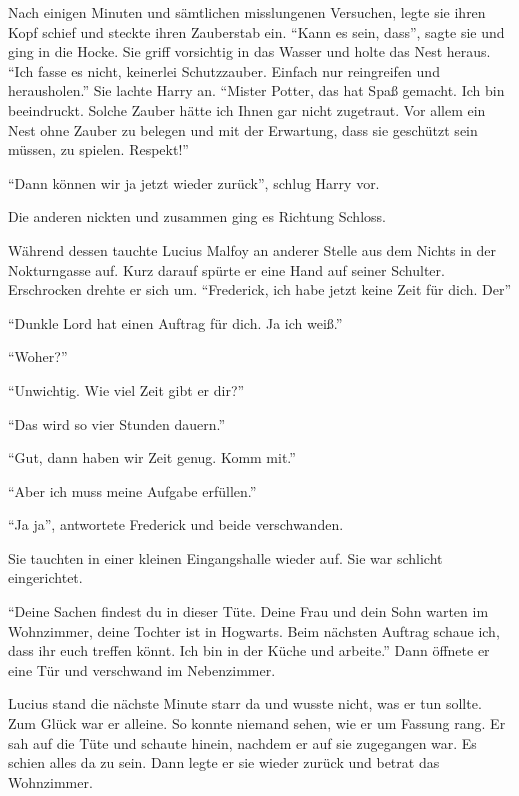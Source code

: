 Nach einigen Minuten und sämtlichen misslungenen Versuchen, legte sie ihren Kopf schief und steckte ihren Zauberstab ein. \enquote{Kann es sein, dass\abs}, sagte sie und ging in die Hocke. Sie griff vorsichtig in das Wasser und holte das Nest heraus. \enquote{Ich fasse es nicht, keinerlei Schutzzauber. Einfach nur reingreifen und herausholen.} Sie lachte Harry an. \enquote{Mister Potter, das hat Spaß gemacht. Ich bin beeindruckt. Solche Zauber hätte ich Ihnen gar nicht zugetraut. Vor allem ein Nest ohne Zauber zu belegen und mit der Erwartung, dass sie geschützt sein müssen, zu spielen. Respekt!}

\enquote{Dann können wir ja jetzt wieder zurück}, schlug Harry vor.

Die anderen nickten und zusammen ging es Richtung Schloss.

\trenn

Während dessen tauchte Lucius Malfoy an anderer Stelle aus dem Nichts in der Nokturngasse auf. Kurz darauf spürte er eine Hand auf seiner Schulter. Erschrocken drehte er sich um. \enquote{Frederick, ich habe jetzt keine Zeit für dich. Der\abs}

\enquote{\aabs Dunkle Lord hat einen Auftrag für dich. Ja ich weiß.}

\enquote{Woher?}

\enquote{Unwichtig. Wie viel Zeit gibt er dir?}

\enquote{Das wird so vier Stunden dauern.}

\enquote{Gut, dann haben wir Zeit genug. Komm mit.}

\enquote{Aber ich muss meine Aufgabe erfüllen.}

\enquote{Ja ja}, antwortete Frederick und beide verschwanden.

Sie tauchten in einer kleinen Eingangshalle wieder auf. Sie war schlicht eingerichtet.

\enquote{Deine Sachen findest du in dieser Tüte. Deine Frau und dein Sohn warten im Wohnzimmer, deine Tochter ist in Hogwarts. Beim nächsten Auftrag schaue ich, dass ihr euch treffen könnt. Ich bin in der Küche und arbeite.} Dann öffnete er eine Tür und verschwand im Nebenzimmer.

Lucius stand die nächste Minute starr da und wusste nicht, was er tun sollte. Zum Glück war er alleine. So konnte niemand sehen, wie er um Fassung rang. Er sah auf die Tüte und schaute hinein, nachdem er auf sie zugegangen war. Es schien alles da zu sein. Dann legte er sie wieder zurück und betrat das Wohnzimmer.

